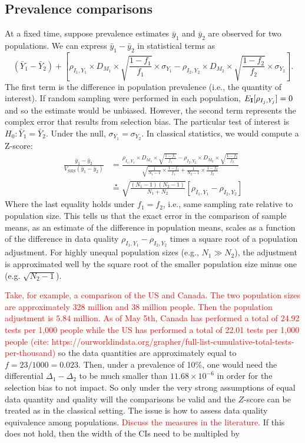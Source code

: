 \documentclass[aoas]{amsart}
\def\I{\bf I}
\begin{document}
\subsection{Prevalence comparisons}

At a fixed time, suppose prevalence estimates $\bar y_1$ and $\bar y_2$ are observed for two populations. We can express $\bar y_1 - \bar y_2$ in statistical terms as
$$
(\bar Y_1 - \bar Y_2) + \left[ \rho_{I_1, Y_1} \times D_{M_1} \times \sqrt{\frac{1-f_1}{f_1}} \times \sigma_{Y_1}  - \rho_{I_2, Y_2} \times D_{M_2} \times \sqrt{\frac{1-f_2}{f_2}} \times \sigma_{Y_2} \right].
$$
The first term is the difference in population prevalence (i.e., the quantity of interest).  If random sampling were performed in each population, $E_{\I} [ \rho_{I_j, Y_j}] = 0$ and so the estimate would be unbiased.  However, the second term represents the complex error that results from selection bias.
The particular test of interest is $H_0: \bar Y_1 = \bar Y_2$.  Under the null, $\sigma_{Y_1} = \sigma_{Y_2}$.  In classical statistics, we would compute a Z-score:
$$
\begin{aligned}
\frac{\bar y_1 - \bar y_2}{ V_{SRS} (\bar y_1 - \bar y_2) } &=
\frac{\rho_{I_1, Y_1} \times D_{M_1} \times \sqrt{\frac{1-f_1}{f_1}}  - \rho_{I_2, Y_2} \times D_{M_2} \times \sqrt{\frac{1-f_2}{f_2}} }{ \sqrt{\frac{1}{N_1 -1} \times \frac{1-f_1}{f_1} + \frac{1}{N_2 - 1} \times \frac{1-f_2}{f_2}} }  \\
&\overset{\star}{=}
\sqrt{\frac{(N_1-1)(N_2 -1)}{N_1 + N_2}} \left[ \rho_{I_1, Y_1} - \rho_{I_2, Y_2} \right]
\end{aligned}
$$
Where the last equality holds under $f_1 = f_2$, i.e., same sampling rate relative to population size. This tells us that the exact error in the comparison of sample means, as an estimate of the difference in population means, scales as a function of the difference in data quality $\rho_{I_1, Y_1} - \rho_{I_2, Y_2}$ times a square root of a population adjustment.  For highly unequal population sizes (e.g., $N_1 \gg N_2$), the adjustment is approximated well by the square root of the smaller population size minus one (e.g. $\sqrt{N_2 -1}$).

\textcolor{red}{Take, for example, a comparison of the US and Canada.  The two population sizes are approximately 328 million and 38 million people.  Then the population adjustment is $5.84$ million. As of May 5th, Canada has performed a total of 24.92 tests per 1,000 people while the US has performed a total of 22.01 tests per 1,000 people (cite: https://ourworldindata.org/grapher/full-list-cumulative-total-tests-per-thousand)} so the data quantities are approximately equal to $f = 23/1000 = 0.023$.  Then, under a prevalence of 10\%, one would need the differential $\Delta_1-\Delta_2$ to be much smaller than $11.68 \times 10^{-6}$ in order for the selection bias to not impact.  So only under the very strong assumptions of equal data quantity and quality will the comparisons be valid and the $Z$-score can be treated as in the classical setting.  The issue is how to assess data quality equivalence among populations. \textcolor{red}{Discuss the measures in the literature.}  If this does not hold, then the width of the CIs need to be multipled by
\end{document}
